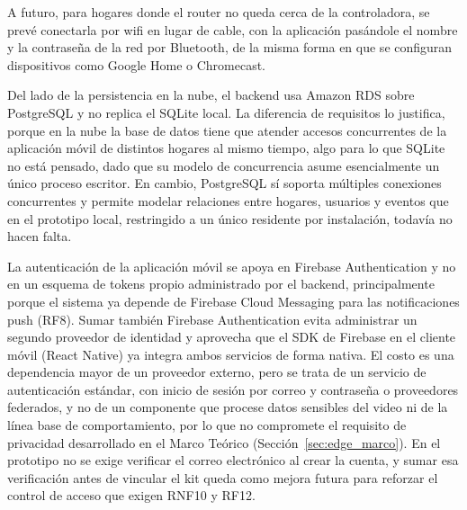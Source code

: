 A futuro, para hogares donde el router no queda cerca de la controladora, se prevé conectarla por wifi en lugar de cable, con la aplicación pasándole el nombre y la contraseña de la red por Bluetooth, de la misma forma en que se configuran dispositivos como Google Home o Chromecast.

Del lado de la persistencia en la nube, el backend usa Amazon RDS sobre PostgreSQL y no replica el SQLite local.
La diferencia de requisitos lo justifica, porque en la nube la base de datos tiene que atender accesos concurrentes de la aplicación móvil de distintos hogares al mismo tiempo, algo para lo que SQLite no está pensado, dado que su modelo de concurrencia asume esencialmente un único proceso escritor.
En cambio, PostgreSQL sí soporta múltiples conexiones concurrentes y permite modelar relaciones entre hogares, usuarios y eventos que en el prototipo local, restringido a un único residente por instalación, todavía no hacen falta.

La autenticación de la aplicación móvil se apoya en Firebase Authentication y no en un esquema de tokens propio administrado por el backend, principalmente porque el sistema ya depende de Firebase Cloud Messaging para las notificaciones push (RF8).
Sumar también Firebase Authentication evita administrar un segundo proveedor de identidad y aprovecha que el SDK de Firebase en el cliente móvil (React Native) ya integra ambos servicios de forma nativa.
El costo es una dependencia mayor de un proveedor externo, pero se trata de un servicio de autenticación estándar, con inicio de sesión por correo y contraseña o proveedores federados, y no de un componente que procese datos sensibles del video ni de la línea base de comportamiento, por lo que no compromete el requisito de privacidad desarrollado en el Marco Teórico (Sección~\ref{sec:edge_marco}).
En el prototipo no se exige verificar el correo electrónico al crear la cuenta, y sumar esa verificación antes de vincular el kit queda como mejora futura para reforzar el control de acceso que exigen RNF10 y RF12.

